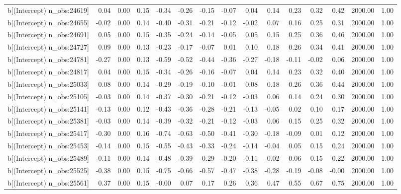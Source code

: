 \begin{table}[ht]
\begin{tabular}{rrrrrrrrrrrrrrr}
  b[(Intercept) n\_obs:24619] & 0.04 & 0.00 & 0.15 & -0.34 & -0.26 & -0.15 & -0.07 & 0.04 & 0.14 & 0.23 & 0.32 & 0.42 & 2000.00 & 1.00 \\ 
  b[(Intercept) n\_obs:24655] & -0.02 & 0.00 & 0.14 & -0.40 & -0.31 & -0.21 & -0.12 & -0.02 & 0.07 & 0.16 & 0.25 & 0.31 & 2000.00 & 1.00 \\ 
  b[(Intercept) n\_obs:24691] & 0.05 & 0.00 & 0.15 & -0.35 & -0.24 & -0.14 & -0.05 & 0.05 & 0.15 & 0.25 & 0.36 & 0.46 & 2000.00 & 1.00 \\ 
  b[(Intercept) n\_obs:24727] & 0.09 & 0.00 & 0.13 & -0.23 & -0.17 & -0.07 & 0.01 & 0.10 & 0.18 & 0.26 & 0.34 & 0.41 & 2000.00 & 1.00 \\ 
  b[(Intercept) n\_obs:24781] & -0.27 & 0.00 & 0.13 & -0.59 & -0.52 & -0.44 & -0.36 & -0.27 & -0.18 & -0.11 & -0.02 & 0.06 & 2000.00 & 1.00 \\ 
  b[(Intercept) n\_obs:24817] & 0.04 & 0.00 & 0.15 & -0.34 & -0.26 & -0.16 & -0.07 & 0.04 & 0.14 & 0.23 & 0.32 & 0.40 & 2000.00 & 1.00 \\ 
  b[(Intercept) n\_obs:25033] & 0.08 & 0.00 & 0.14 & -0.29 & -0.19 & -0.10 & -0.01 & 0.08 & 0.18 & 0.26 & 0.36 & 0.44 & 2000.00 & 1.00 \\ 
  b[(Intercept) n\_obs:25105] & -0.03 & 0.00 & 0.14 & -0.37 & -0.30 & -0.21 & -0.12 & -0.03 & 0.06 & 0.14 & 0.24 & 0.30 & 2000.00 & 1.00 \\ 
  b[(Intercept) n\_obs:25141] & -0.13 & 0.00 & 0.12 & -0.43 & -0.36 & -0.28 & -0.21 & -0.13 & -0.05 & 0.02 & 0.10 & 0.17 & 2000.00 & 1.00 \\ 
  b[(Intercept) n\_obs:25381] & -0.03 & 0.00 & 0.14 & -0.39 & -0.32 & -0.21 & -0.12 & -0.03 & 0.06 & 0.15 & 0.25 & 0.32 & 2000.00 & 1.00 \\ 
  b[(Intercept) n\_obs:25417] & -0.30 & 0.00 & 0.16 & -0.74 & -0.63 & -0.50 & -0.41 & -0.30 & -0.18 & -0.09 & 0.01 & 0.12 & 2000.00 & 1.00 \\ 
  b[(Intercept) n\_obs:25453] & -0.14 & 0.00 & 0.15 & -0.55 & -0.43 & -0.33 & -0.24 & -0.14 & -0.04 & 0.05 & 0.15 & 0.24 & 2000.00 & 1.00 \\ 
  b[(Intercept) n\_obs:25489] & -0.11 & 0.00 & 0.14 & -0.48 & -0.39 & -0.29 & -0.20 & -0.11 & -0.02 & 0.06 & 0.15 & 0.22 & 2000.00 & 1.00 \\ 
  b[(Intercept) n\_obs:25525] & -0.38 & 0.00 & 0.15 & -0.75 & -0.66 & -0.57 & -0.47 & -0.38 & -0.28 & -0.19 & -0.08 & -0.00 & 2000.00 & 1.00 \\ 
  b[(Intercept) n\_obs:25561] & 0.37 & 0.00 & 0.15 & -0.00 & 0.07 & 0.17 & 0.26 & 0.36 & 0.47 & 0.55 & 0.67 & 0.75 & 2000.00 & 1.00 \\ 

\end{tabular}
\end{table}
